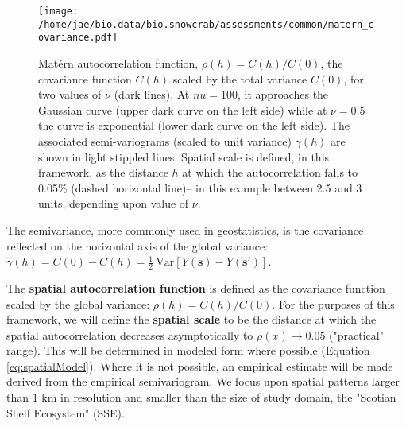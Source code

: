 \documentclass[letterpaper,portrait,11pt]{scrartcl}
\numberwithin{equation}{section}    %
\numberwithin{figure}{section}    %
\numberwithin{table}{section}       %
\begin{document}
\begin{figure}
  \centering
  \texttt{[image: /home/jae/bio.data/bio.snowcrab/assessments/common/matern\_covariance.pdf]}
  \caption{Mat\'{e}rn autocorrelation function, $\rho(h)=C(h)/C(0)$, the covariance function $C(h)$ scaled by the total variance $C(0)$, for two values of $\nu$ (dark lines). At $nu=100$, it approaches the Gaussian curve (upper dark curve on the left side) while at $\nu=0.5$ the curve is exponential (lower dark curve on the left side). The associated semi-variograms (scaled to unit variance) $\gamma(h)$ are shown in light stippled lines. Spatial scale is defined, in this framework, as the distance $h$ at which the autocorrelation falls to 0.05\% (dashed horizontal line)-- in this example between 2.5 and 3 units, depending upon value of $\nu$.}
  \label{fig:matern_acf}
  \iffalse
  #------------------ created by the following in an R session:
  ## plot of matern covariance
  phi = 1
  sigma = 1
  x = seq(0, 4, by=0.1)
  matern.covariance = function( sigma, nu, phi, x) {
    1/(2^(nu-1)*gamma(nu) ) * (sqrt(2*nu)*x/phi)^nu * besselK(sqrt(2*nu)*x/phi, nu)
  }
  y = matern.covariance( sigma, nu=0.5, phi, x)
  y100 = matern.covariance( sigma, nu=100, phi, x)
  y[1]=y100[1] = sigma
  sv = sigma- y
  sv100 = sigma - y100

  pdf( file="~/bio.data/bio.snowcrab/assessments/common/matern_covariance.pdf")
  plot( y~x, type="l", ylim=c(0,1.05), xlab="h", ylab="", lwd=2 )
  lines( x,y100, lwd=2 )
  lines( x,sv100 , lty="dotted" )
  lines( x,sv , lty="dotted" )
  abline (h=0.05, lty="dashed")
  text ( 0.22*max(x), 0.9, "nu=100 \n ~ Gaussian" )
  text ( 0.28*max(x), 0.2,  "nu=0.5 \n ~ Exponential")
  dev.off()
  \fi

\end{figure}


The semivariance, more commonly used in geostatistics, is the covariance reflected on the horizontal axis of the global variance: $\gamma(h)=C(0)-C(h) = \frac{1}{2} \ \textrm{Var} [ Y(\bm{s}) - Y(\bm{s}')]$.

The \textbf{spatial autocorrelation function} is defined as the covariance function scaled by the global variance: $\rho(h)=C(h)/C(0)$. For the purposes of this framework, we will define the \textbf{spatial scale} to be the distance at which the spatial autocorrelation decreases asymptotically to $\rho(x) \rightarrow 0.05$ ("practical" range). This will be determined in modeled form where possible (Equation \ref{eq:spatialModel}). Where it is not possible, an empirical estimate will be made derived from the empirical semivariogram. We focus upon spatial patterns larger than 1 km in resolution and smaller than the size of study domain, the "Scotian Shelf Ecosystem" (SSE).
\end{document}
